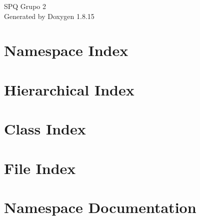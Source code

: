 \let\mypdfximage\pdfximage\def\pdfximage{\immediate\mypdfximage}\documentclass[twoside]{book}
\newcommand{\+}{\discretionary{\mbox{\scriptsize$\hookleftarrow$}}{}{}}
\newcommand{\clearemptydoublepage}{%
  \newpage{\pagestyle{empty}\cleardoublepage}%
}
\begin{document}
\hypersetup{pageanchor=false,
             bookmarksnumbered=true,
             pdfencoding=unicode
            }
\begin{titlepage}
\vspace*{7cm}
\begin{center}%
{\Large S\+PQ Grupo 2 }\\
\vspace*{1cm}
{\large Generated by Doxygen 1.8.15}\\
\end{center}
\end{titlepage}
\clearemptydoublepage
{}
\tableofcontents
\clearemptydoublepage
{}
\hypersetup{pageanchor=true}

\chapter{Namespace Index}

\chapter{Hierarchical Index}

\chapter{Class Index}

\chapter{File Index}

\chapter{Namespace Documentation}





\end{document}
